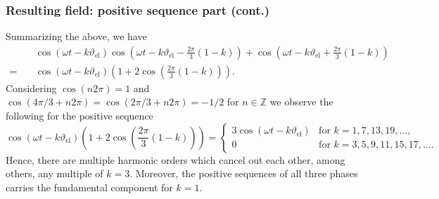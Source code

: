 \begin{frame}
	\frametitle{Resulting field: positive sequence part (cont.)}
    \onslide<+->
    Summarizing the above, we have
        \begin{align*}
        &\cos(\omega t - k \vartheta_\mathrm{el})  \cos(\omega t - k \vartheta_\mathrm{el} - \frac{2\pi}{3}(1-k)) + \cos(\omega t - k \vartheta_\mathrm{el} + \frac{2\pi}{3}(1-k))\\
         = \quad &\cos(\omega t - k \vartheta_\mathrm{el})(1+2\cos(\frac{2\pi}{3}(1-k))).
    \end{align*}
    \onslide<+->
    Considering $\cos(n 2 \pi)=1$ and $\cos(4\pi/3 + n 2 \pi) = \cos(2\pi/3 + n 2 \pi)=-1/2$ for $n \in \mathbb{Z}$ we observe the following for the positive sequence
    \begin{equation}
        \cos(\omega t - k \vartheta_\mathrm{el})(1+2\cos(\frac{2\pi}{3}(1-k))) = \begin{cases}
            3 \cos(\omega t - k \vartheta_\mathrm{el}) & \text{for } k=1,7,13,19,\ldots, \\
            0 & \text{for } k=3,5,9,11,15, 17,\ldots.
        \end{cases}
    \end{equation}
    \onslide<+->
    Hence, there are multiple harmonic orders which cancel out each other, among others, any multiple of $k=3$. Moreover, the positive sequences of all three phases carries the fundamental component for $k=1$.    
\end{frame}

